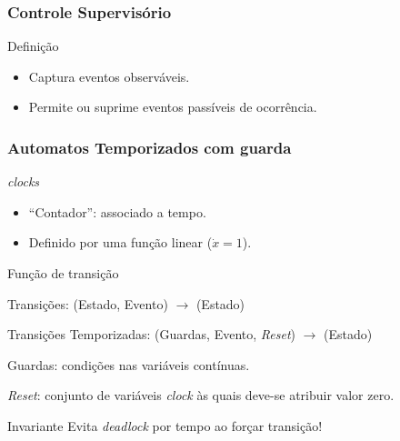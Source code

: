 \documentclass[hyperref={pdfpagelabels=false},table]{beamer}
\newcommand{\subitem}[1]{
    {\setlength\itemindent{30pt} \item[$\rightarrow$] #1}
}
\begin{document}
\begin{frame}
	\frametitle{Controle Supervisório}
	\begin{block}{Definição}
		\begin{itemize}
		  \item Captura eventos observáveis.
		  \item Permite ou suprime eventos passíveis de ocorrência.
		\end{itemize}
	\end{block}
	
	\vspace{0.3cm}
	
\end{frame}

\begin{frame}	
	\frametitle{Automatos Temporizados com guarda}
	
	\begin{exampleblock}{\textit{clocks}}
		\begin{itemize}
		  \item ``Contador'': associado a tempo.
		  \item Definido por uma função linear ($\dot{x} = 1$).
		\end{itemize}
	\end{exampleblock}
	
	\begin{block}{Função de transição}
		\begin{itemize}
		  \item Transições: (Estado, Evento) $\rightarrow$ (Estado)
		  \item Transições Temporizadas: (Guardas, Evento, \textit{Reset})
		  $\rightarrow$ (Estado)
		  \subitem{Guardas: condições nas variáveis contínuas.}
		  \subitem{\textit{Reset}: conjunto de variáveis \textit{clock} às quais
		  deve-se atribuir valor zero.}
		\end{itemize}
	\end{block}
	
\end{frame}

\begin{frame}
	\vspace{-0.6cm}
	
	\pause
	\begin{exampleblock}{Invariante}
		Evita \textit{deadlock} por tempo ao forçar transição!
	\end{exampleblock}
\end{frame}
\end{document}
